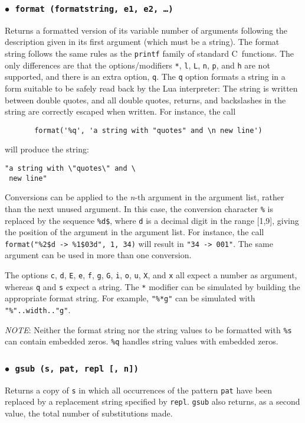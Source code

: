 \documentclass[11pt]{article}
\makeatletter
\newcommand{\M}[1]{{\rm\emph{#1}}}
\newcommand{\T}[1]{{\tt #1}}
\newcommand{\DefLIB}[1]{\index{#1@{\tt #1}}}
\newcommand{\ff}{$\bullet$\ }
\newcommand{\NOTE}{\par\medskip\noindent\emph{NOTE}: }
\makeatother
\begin{document}
\subsubsection*{\ff \T{format (formatstring, e1, e2, \ldots)}}\DefLIB{format}
\label{format}
Returns a formatted version of its variable number of arguments
following the description given in its first argument (which must be a string).
The format string follows the same rules as the \verb|printf| family of
standard C~functions.
The only differences are that the options/modifiers
\verb|*|, \verb|l|, \verb|L|, \verb|n|, \verb|p|,
and \verb|h| are not supported,
and there is an extra option, \verb|q|.
The \verb|q| option formats a string in a form suitable to be safely read
back by the Lua interpreter:
The string is written between double quotes,
and all double quotes, returns, and backslashes in the string
are correctly escaped when written.
For instance, the call
\begin{verbatim}
       format('%q', 'a string with "quotes" and \n new line')
\end{verbatim}
will produce the string:
\begin{verbatim}
"a string with \"quotes\" and \
 new line"
\end{verbatim}

Conversions can be applied to the \M{n}-th argument in the argument list,
rather than the next unused argument.
In this case, the conversion character \verb|%| is replaced
by the sequence \verb|%d$|, where \verb|d| is a
decimal digit in the range [1,9],
giving the position of the argument in the argument list.
For instance, the call \verb|format("%2$d -> %1$03d", 1, 34)| will
result in \verb|"34 -> 001"|.
The same argument can be used in more than one conversion.

The options \verb|c|, \verb|d|, \verb|E|, \verb|e|, \verb|f|,
\verb|g|, \verb|G|, \verb|i|, \verb|o|, \verb|u|, \verb|X|, and \verb|x| all
expect a number as argument,
whereas \verb|q| and \verb|s| expect a string.
The \verb|*| modifier can be simulated by building
the appropriate format string.
For example, \verb|"%*g"| can be simulated with
\verb|"%"..width.."g"|.

\NOTE
Neither the format string nor the string values to be formatted with
\verb|%s| can contain embedded zeros.
\verb|%q| handles string values with embedded zeros.

\subsubsection*{\ff \T{gsub (s, pat, repl [, n])}}
\DefLIB{gsub}
Returns a copy of \verb|s|
in which all occurrences of the pattern \verb|pat| have been
replaced by a replacement string specified by \verb|repl|.
\verb|gsub| also returns, as a second value,
the total number of substitutions made.
\end{document}
